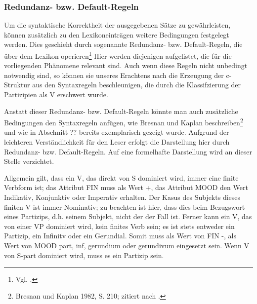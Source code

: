 \documentclass[12pt,a4paper]{article}
\begin{document}









\subsubsection{Redundanz- bzw. Default-Regeln}
Um die syntaktische Korrektheit der ausgegebenen Sätze zu gewährleisten, können zusätzlich zu den Lexikoneinträgen weitere Bedingungen festgelegt werden. Dies geschieht durch sogenannte Redundanz- bzw. Default-Regeln, die über dem Lexikon operieren\footnote{Vgl. \cite[23-4]{Rohrer}.} Hier werden diejenigen aufgelistet, die für die vorliegenden Phänomene relevant sind. Auch wenn diese Regeln nicht unbedingt notwendig sind, so können sie unseres Erachtens nach die Erzeugung der c-Struktur aus den Syntaxregeln beschleunigen, die durch die Klassifzierung der Partizipien als V erschwert
wurde.

Anstatt dieser Redundanz- bzw. Default-Regeln könnte man auch zusätzliche Bedingungen den Syntaxregeln anfügen, wie Bresnan und Kaplan beschreiben\footnote{Bresnan und Kaplan 1982, S. 210; zitiert nach \cite[54]{Rohrer}.} und wie in Abschnitt ?? bereits exemplarisch gezeigt wurde. Aufgrund der leichteren Verständlichkeit für den Leser erfolgt die Darstellung hier durch Redundanz- bzw. Default-Regeln. Auf eine formelhafte Darstellung wird an dieser Stelle verzichtet.

Allgemein gilt, dass ein V, das direkt von S dominiert wird, immer eine
finite Verbform ist; das Attribut FIN muss als Wert +, das Attribut MOOD den Wert Indikativ, Konjunktiv oder Imperativ erhalten.
Der Kasus des Subjekts dieses finiten V ist immer Nominativ; zu beachten ist hier, dass dies beim Bezugswort eines Partizips, d.h. seinem Subjekt, nicht der der Fall ist.
Ferner kann ein V, das von einer VP dominiert wird, kein finites Verb sein; es ist stets entweder ein Partizip, ein Infinitv oder ein Gerundial. Somit muss als Wert von FIN -, als Wert von MOOD part, inf, gerundium  oder gerundivum eingesetzt sein.
Wenn V von S-part dominiert wird, muss es ein Partizip sein.
\end{document}
